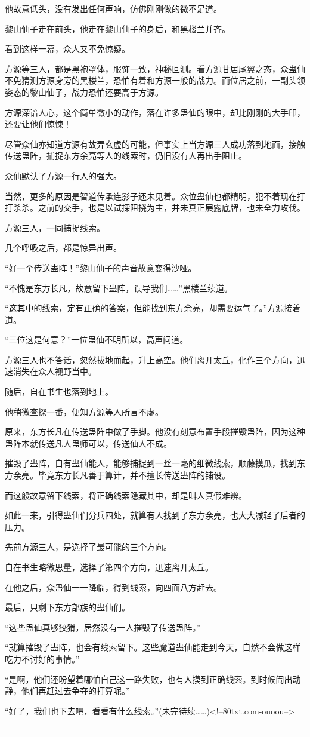 \begin{this_body}
他故意低头，没有发出任何声响，仿佛刚刚做的微不足道。

黎山仙子走在前头，他走在黎山仙子的身后，和黑楼兰并齐。

看到这样一幕，众人又不免惊疑。

方源等三人，都是黑袍罩体，服饰一致，神秘叵测。看方源甘居尾翼之态，众蛊仙不免猜测方源身旁的黑楼兰，恐怕有着和方源一般的战力。而位居之前，一副头领姿态的黎山仙子，战力恐怕还要高于方源。

方源深谙人心，这个简单微小的动作，落在许多蛊仙的眼中，却比刚刚的大手印，还要让他们惊悚！

尽管众仙亦知道方源有故弄玄虚的可能，但事实上当方源三人成功落到地面，接触传送蛊阵，捕捉东方余亮等人的线索时，仍旧没有人再出手阻止。

众仙默认了方源一行人的强大。

当然，更多的原因是智道传承连影子还未见着。众位蛊仙也都精明，犯不着现在打打杀杀。之前的交手，也是以试探阻挠为主，并未真正展露底牌，也未全力攻伐。

方源三人，一同捕捉线索。

几个呼吸之后，都是惊异出声。

“好一个传送蛊阵！”黎山仙子的声音故意变得沙哑。

“不愧是东方长凡，故意留下蛊阵，误导我们……”黑楼兰续道。

“这其中的线索，定有正确的答案，但能找到东方余亮，却需要运气了。”方源接着道。

“三位这是何意？”一位蛊仙不明所以，高声问道。

方源三人也不答话，忽然拔地而起，升上高空。他们离开太丘，化作三个方向，迅速消失在众人视野当中。

随后，自在书生也落到地上。

他稍微查探一番，便知方源等人所言不虚。

原来，东方长凡在传送蛊阵中做了手脚。他没有刻意布置手段摧毁蛊阵，因为这种蛊阵本就传送凡人蛊师可以，传送仙人不成。

摧毁了蛊阵，自有蛊仙能人，能够捕捉到一丝一毫的细微线索，顺藤摸瓜，找到东方余亮。毕竟东方长凡善于算计，并不擅长传送蛊阵的铺设。

而这般故意留下线索，将正确线索隐藏其中，却是叫人真假难辨。

如此一来，引得蛊仙们分兵四处，就算有人找到了东方余亮，也大大减轻了后者的压力。

先前方源三人，是选择了最可能的三个方向。

自在书生略微思量，选择了第四个方向，迅速离开太丘。

在他之后，众蛊仙一一降临，得到线索，向四面八方赶去。

最后，只剩下东方部族的蛊仙们。

“这些蛊仙真够狡猾，居然没有一人摧毁了传送蛊阵。”

“就算摧毁了蛊阵，也会有线索留下。这些魔道蛊仙能走到今天，自然不会做这样吃力不讨好的事情。”

“是啊，他们还盼望着哪怕自己这一路失败，也有人摸到正确线索。到时候闹出动静，他们再赶过去争夺的打算呢。”

“好了，我们也下去吧，看看有什么线索。”(未完待续……)<!--80txt.com-ouoou-->

------------

\end{this_body}

